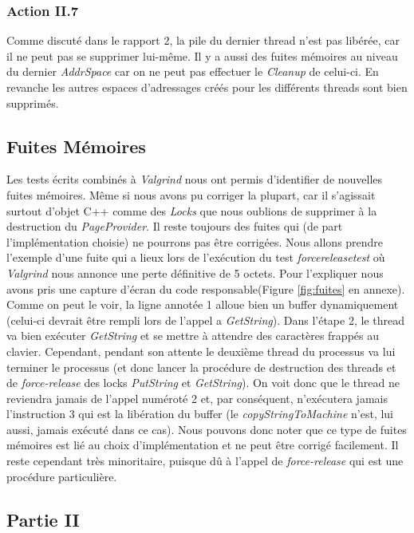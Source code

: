 \documentclass{article}
\begin{document}
\subsubsection{Action II.7}
Comme discuté dans le rapport 2, la pile du dernier thread n'est pas libérée, car il ne peut pas se supprimer lui-même. Il y a aussi des fuites mémoires au niveau
du dernier \textit{AddrSpace} car on ne peut pas effectuer le \textit{Cleanup} de celui-ci. En revanche les autres espaces d'adressages créés pour les différents
threads sont bien supprimés.

\subsection{Fuites Mémoires}
Les tests écrits combinés à \textit{Valgrind} nous ont permis d'identifier de nouvelles fuites mémoires. Même si nous avons pu corriger la plupart, car il s'agissait
surtout d'objet C++ comme des \textit{Locks} que nous oublions de supprimer à la destruction du \textit{PageProvider}. Il reste toujours des fuites qui
(de part l'implémentation choisie) ne pourrons pas être corrigées. Nous allons prendre l'exemple d'une fuite qui a lieux lors de l'exécution du test \textit{forcereleasetest} où
\textit{Valgrind} nous annonce une perte définitive de 5 octets. Pour l'expliquer nous avons pris une capture d'écran du code responsable(Figure \ref{fig:fuites} en annexe).
Comme on peut le voir, la ligne annotée 1 alloue bien un buffer dynamiquement (celui-ci devrait être rempli lors de l'appel a \textit{GetString}). Dans l'étape 2, le thread va bien
exécuter \textit{GetString} et se mettre à attendre des caractères frappés au clavier. Cependant, pendant son attente le deuxième thread du processus va lui terminer le processus 
(et donc lancer la procédure de destruction des threads et de \textit{force-release} des locks \textit{PutString} et \textit{GetString}). On voit donc que le thread ne reviendra jamais de l'appel
numéroté 2 et, par conséquent, n'exécutera jamais l'instruction 3 qui est la libération du buffer (le \textit{copyStringToMachine} n'est, lui aussi, jamais exécuté dans ce cas).
Nous pouvons donc noter que ce type de fuites mémoires est lié au choix d'implémentation et ne peut être corrigé facilement. Il reste cependant très minoritaire, puisque dû à l'appel
de \textit{force-release} qui est une procédure particulière.
\subsection{Partie II}
\end{document}
